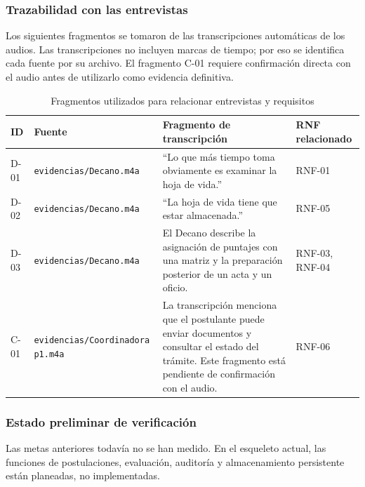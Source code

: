 \subsubsection{Trazabilidad con las entrevistas}

Los siguientes fragmentos se tomaron de las transcripciones automáticas de los audios. Las transcripciones no incluyen marcas de tiempo; por eso se identifica cada fuente por su archivo. El fragmento C-01 requiere confirmación directa con el audio antes de utilizarlo como evidencia definitiva.

\begin{table}[H]
\centering
\small
\caption{Fragmentos utilizados para relacionar entrevistas y requisitos}
\begin{tabularx}{\linewidth}{@{}p{0.8cm}p{3.1cm}X p{1.8cm}@{}}
\toprule
\textbf{ID} & \textbf{Fuente} & \textbf{Fragmento de transcripción} & \textbf{RNF relacionado} \\
\midrule
D-01 & \nolinkurl{evidencias/Decano.m4a} &
\enquote{Lo que más tiempo toma obviamente es examinar la hoja de vida.} &
RNF-01 \\

D-02 & \nolinkurl{evidencias/Decano.m4a} &
\enquote{La hoja de vida tiene que estar almacenada.} &
RNF-05 \\

D-03 & \nolinkurl{evidencias/Decano.m4a} &
El Decano describe la asignación de puntajes con una matriz y la preparación posterior de un acta y un oficio. &
RNF-03, RNF-04 \\

C-01 & \nolinkurl{evidencias/Coordinadora p1.m4a} &
La transcripción menciona que el postulante puede enviar documentos y consultar el estado del trámite. Este fragmento está pendiente de confirmación con el audio. &
RNF-06 \\
\bottomrule
\end{tabularx}
\end{table}

\subsubsection{Estado preliminar de verificación}

Las metas anteriores todavía no se han medido. En el esqueleto actual, las funciones de postulaciones, evaluación, auditoría y almacenamiento persistente están planeadas, no implementadas.

